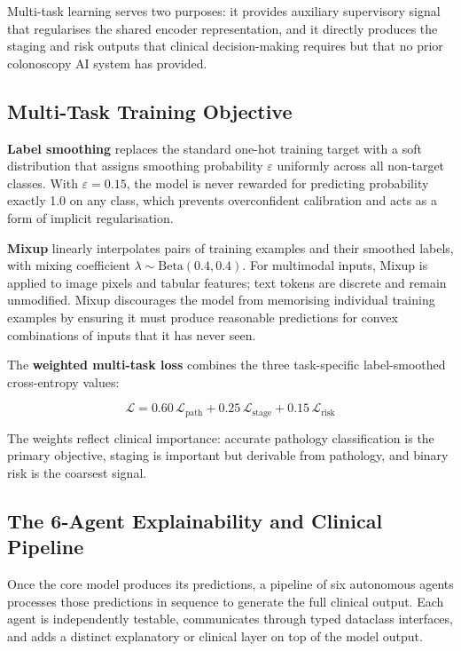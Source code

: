 \documentclass[conference]{IEEEtran}
\begin{document}
Multi-task learning serves two purposes: it provides auxiliary supervisory
signal that regularises the shared encoder representation, and it directly
produces the staging and risk outputs that clinical decision-making requires
but that no prior colonoscopy AI system has provided.

\subsection{Multi-Task Training Objective}

\textbf{Label smoothing} replaces the standard one-hot training target with
a soft distribution that assigns smoothing probability $\varepsilon$ uniformly
across all non-target classes. With $\varepsilon\!=\!0.15$, the model is
never rewarded for predicting probability exactly 1.0 on any class, which
prevents overconfident calibration and acts as a form of implicit regularisation.

\textbf{Mixup} \cite{zhang2018} linearly interpolates pairs of training
examples and their smoothed labels, with mixing coefficient
$\lambda\!\sim\!\text{Beta}(0.4, 0.4)$. For multimodal inputs, Mixup is
applied to image pixels and tabular features; text tokens are discrete and
remain unmodified. Mixup discourages the model from memorising individual
training examples by ensuring it must produce reasonable predictions for
convex combinations of inputs that it has never seen.

The \textbf{weighted multi-task loss} combines the three task-specific
label-smoothed cross-entropy values:

\begin{equation}
  \mathcal{L} = 0.60\,\mathcal{L}_{\text{path}}
              + 0.25\,\mathcal{L}_{\text{stage}}
              + 0.15\,\mathcal{L}_{\text{risk}}
\end{equation}

The weights reflect clinical importance: accurate pathology classification
is the primary objective, staging is important but derivable from pathology,
and binary risk is the coarsest signal.

\subsection{The 6-Agent Explainability and Clinical Pipeline}

Once the core model produces its predictions, a pipeline of six autonomous
agents processes those predictions in sequence to generate the full clinical
output. Each agent is independently testable, communicates through typed
dataclass interfaces, and adds a distinct explanatory or clinical layer on
top of the model output.
\end{document}

